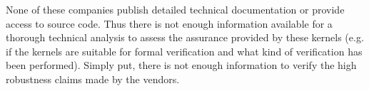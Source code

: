 None of these companies publish detailed technical documentation or provide
access to source code. Thus there is not enough information available for a
thorough technical analysis to assess the assurance provided by these kernels
(e.g. if the kernels are suitable for formal verification and what kind of
verification has been performed). Simply put, there is not enough information
to verify the high robustness claims made by the vendors.
